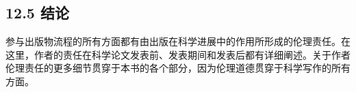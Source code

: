 \subsection*{12.5 结论}
参与出版物流程的所有方面都有由出版在科学进展中的作用所形成的伦理责任。在这里，作者的责任在科学论文发表前、发表期间和发表后都有详细阐述。关于作者伦理责任的更多细节贯穿于本书的各个部分，因为伦理道德贯穿于科学写作的所有方面。

